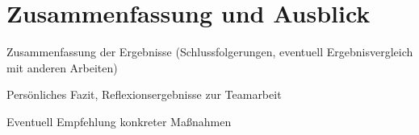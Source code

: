 \chapter{Zusammenfassung und Ausblick}

Zusammenfassung der Ergebnisse (Schlussfolgerungen, eventuell Ergebnisvergleich mit anderen Arbeiten)

Persönliches Fazit, Reflexionsergebnisse zur Teamarbeit

Eventuell Empfehlung konkreter Maßnahmen

